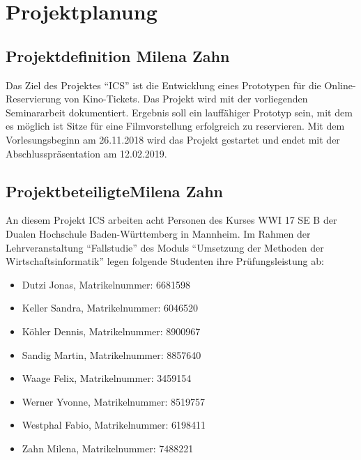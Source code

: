 \chapter{Projektplanung}
	
	\section[Projektdefinition]{Projektdefinition {\hfill \normalsize Milena Zahn}}
	Das Ziel des Projektes \enquote{\ac{ICS}} ist die Entwicklung eines Prototypen für die Online-Reservierung von Kino-Tickets. Das Projekt wird mit der vorliegenden Seminararbeit dokumentiert. Ergebnis soll ein lauffähiger Prototyp sein, mit dem es möglich ist Sitze für eine Filmvorstellung erfolgreich zu reservieren. Mit dem Vorlesungsbeginn am 26.11.2018 wird das Projekt gestartet und endet mit der Abschlusspräsentation am 12.02.2019.
	
	\section[Projektbeteiligte]{Projektbeteiligte{\hfill \normalsize Milena Zahn}}
	An diesem Projekt \ac{ICS} arbeiten acht Personen des Kurses WWI 17 SE B der Dualen Hochschule Baden-Württemberg in Mannheim. Im Rahmen der Lehrveranstaltung \enquote{Fallstudie} des Moduls \enquote{Umsetzung der Methoden der Wirtschaftsinformatik} legen folgende Studenten ihre Prüfungsleistung ab:
	\begin{singlespacing}
	\begin{itemize}
		\item Dutzi Jonas, Matrikelnummer: 6681598
		\item Keller Sandra, Matrikelnummer: 6046520 
		\item Köhler Dennis, Matrikelnummer: 8900967 
		\item Sandig Martin, Matrikelnummer: 8857640 
		\item Waage Felix, Matrikelnummer: 3459154 
		\item Werner Yvonne, Matrikelnummer: 8519757 
		\item Westphal Fabio, Matrikelnummer: 6198411  
		\item Zahn Milena, Matrikelnummer: 7488221 
	\end{itemize}
	\end{singlespacing}

